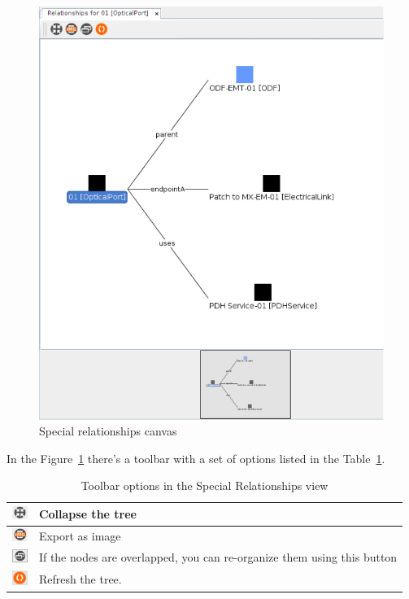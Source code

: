 \documentclass[a4paper]{article}
\begin{document}
		\begin{figure}[h!]
			\centering
			\includegraphics[width=0.8\linewidth]{img/graphical_representation_relationships.png}
			\caption{Special relationships canvas}
			\label{fig:graphical_representation_relationships}
		\end{figure}
			
		In the Figure~\ref{fig:graphical_representation_relationships} there's a toolbar with a set of options listed in the Table~\ref{tab:graphical_representation_relationships_toolbar_icons}.
			
		\begin{table}[h!]
			\centering
			\begin{tabular}{cl}
				\includegraphics[width=0.5cm]{img/icon_collapse_all.png} & Collapse the tree\\
				\midrule
				\includegraphics[width=0.5cm]{img/icon_export_as_image.png} & Export as image\\
				\midrule
				\includegraphics[width=0.5cm]{img/icon_reorganize_nodes.png} & If the nodes are overlapped, you can re-organize them using this button\\
    			\midrule
	 			\includegraphics[width=0.5cm]{img/icon_refresh_view.png} & Refresh the tree.\\
				\midrule
			\end{tabular}
			\caption{Toolbar options in the Special Relationships view}
			\label{tab:graphical_representation_relationships_toolbar_icons}
		\end{table}
			
\end{document}

